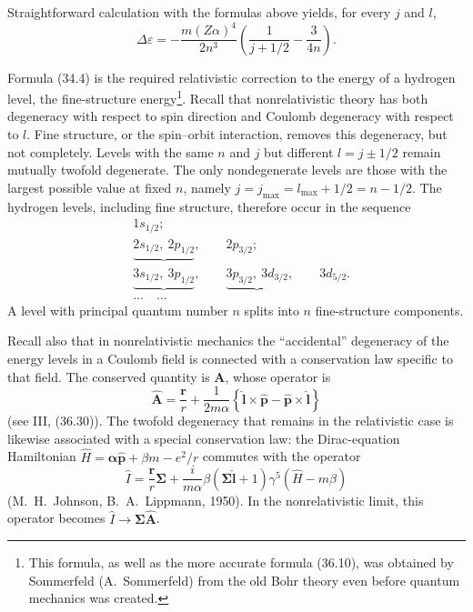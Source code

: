 Straightforward calculation with the formulas above yields, for every $j$ and $l$,
\begin{equation}
\Delta\varepsilon=-\frac{m(Z\alpha)^4}{2n^3}
\left(\frac{1}{j+1/2}-\frac{3}{4n}\right).
\tag{34.4}
\end{equation}

Formula (34.4) is the required relativistic correction to the energy of a hydrogen level, the fine-structure energy\footnote{This formula, as well as the more accurate formula (36.10), was obtained by Sommerfeld (A.~Sommerfeld) from the old Bohr theory even before quantum mechanics was created.}. Recall that nonrelativistic theory has both degeneracy with respect to spin direction and Coulomb degeneracy with respect to $l$. Fine structure, or the spin--orbit interaction, removes this degeneracy, but not completely. Levels with the same $n$ and $j$ but different $l=j\pm1/2$ remain mutually twofold degenerate. The only nondegenerate levels are those with the largest possible value at fixed $n$, namely $j=j_{\max}=l_{\max}+1/2=n-1/2$. The hydrogen levels, including fine structure, therefore occur in the sequence
\[
\begin{aligned}
&1s_{1/2};\\
&\underbrace{2s_{1/2},\ 2p_{1/2}},\qquad 2p_{3/2};\\
&\underbrace{3s_{1/2},\ 3p_{1/2}},\qquad
 \underbrace{3p_{3/2},\ 3d_{3/2}},\qquad 3d_{5/2}.\\[-2pt]
&\ldots\quad\ldots
\end{aligned}
\]
A level with principal quantum number $n$ splits into $n$ fine-structure components.

Recall also that in nonrelativistic mechanics the ``accidental'' degeneracy of the energy levels in a Coulomb field is connected with a conservation law specific to that field. The conserved quantity is $\mathbf A$, whose operator is
\[
\widehat{\mathbf A}=\frac{\mathbf r}{r}
+\frac{1}{2m\alpha}\left\{
\widehat{\mathbf l}\times\widehat{\mathbf p}
-\widehat{\mathbf p}\times\widehat{\mathbf l}
\right\}
\]
(see III, (36.30)). The twofold degeneracy that remains in the relativistic case is likewise associated with a special conservation law: the Dirac-equation Hamiltonian $\widehat H=\boldsymbol\alpha\widehat{\mathbf p}+\beta m-e^2/r$ commutes with the operator
\[
\widehat I=\frac{\mathbf r}{r}\boldsymbol\Sigma
+\frac{i}{m\alpha}\beta(\boldsymbol\Sigma\widehat{\mathbf l}+1)
\gamma^5(\widehat H-m\beta)
\]
(M.~H.~Johnson, B.~A.~Lippmann, 1950). In the nonrelativistic limit, this operator becomes $\widehat I\to\boldsymbol\Sigma\widehat{\mathbf A}$.

